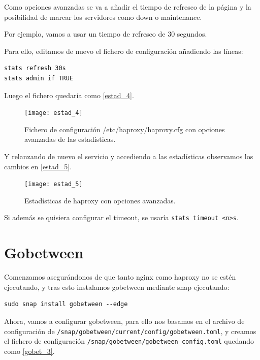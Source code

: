 Como opciones avanzadas se va a añadir el tiempo de refresco de la página y la posibilidad de marcar los servidores como down o maintenance.

Por ejemplo, vamos a usar un tiempo de refresco de 30 segundos.

Para ello, editamos de nuevo el fichero de configuración añadiendo las líneas:

\begin{verbatim}
stats refresh 30s
stats admin if TRUE
\end{verbatim}

Luego el fichero quedaría como \eqref{estad_4}.

\begin{figure}[h!]
\begin{center}
\caption{Fichero de configuración /etc/haproxy/haproxy.cfg con opciones avanzadas de las estadísticas.}
\label{estad_4}
\texttt{[image: estad\_4]}
\end{center}
\end{figure}

Y relanzando de nuevo el servicio y accediendo a las estadísticas observamos los cambios en \eqref{estad_5}.

\begin{figure}[h!]
\begin{center}
\caption{Estadísticas de haproxy con opciones avanzadas.}
\label{estad_5}
\texttt{[image: estad\_5]}
\end{center}
\end{figure}

Si además se quisiera configurar el timeout, se usaría \verb|stats timeout <n>s|.

\chapter{Gobetween}

Comenzamos asegurándonos de que tanto nginx como haproxy no se estén ejecutando, y tras esto instalamos gobetween mediante snap ejecutando:

\begin{verbatim}
sudo snap install gobetween --edge
\end{verbatim}

Ahora, vamos a configurar gobetween, para ello nos basamos en el archivo de configuración de \verb|/snap/gobetween/current/config/gobetween.toml|, y creamos el fichero de configuración \verb|/snap/gobetween/gobetween_config.toml| quedando como \eqref{gobet_3}.

